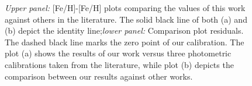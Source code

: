 \documentclass{aa}
\begin{document}
\begin{figure}[]
\begin{center}
\end{center}
\caption{\textit{Upper panel:} [Fe/H]-[Fe/H] plots comparing the values of this work against others in the literature. The solid black line of both (a) and (b) depict the identity line;\textit{lower panel:} Comparison plot residuals. The dashed black line marks the zero point of our calibration. The plot (a) shows the results of our work versus three photometric calibrations taken from the literature, while plot (b) depicts the comparison between our results against other works.}
\label{fig:compfeh}
\end{figure}
\end{document}
